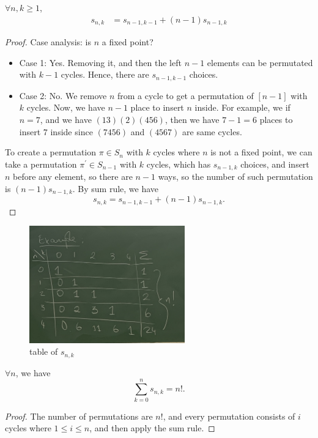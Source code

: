 \begin{proposition} \label{prop: recurtsion for first kind striling num}
    \(\forall n, k \ge 1\), 
    \begin{align*}
        s_{n,k} &= s_{n-1, k-1} + (n-1)s_{n-1,k}
    \end{align*} 
\end{proposition}
\begin{proof}
    Case analysis: is \(n\) a fixed point? 
    \begin{itemize}
        \item Case 1: Yes. Removing it, and then the left \(n-1\) elements can be permutated with \(k-1\) cycles. Hence, there are \(s_{n-1,k-1}\) choices.  
        \item Case 2: No. We remove \(n\) from a cycle to get a permutation of \([n-1]\) with \(k\) cycles. Now, we have \(n-1\) place to insert \(n\) inside. For example, we if \(n=7\), and we have \((13)(2)(456)\), then we have \(7-1=6\) places to insert \(7\) inside since \((7456)\) and \((4567)\) are same cycles.         
    \end{itemize} 
    To create a permutation \(\pi \in S_n\) with \(k\) cycles where \(n\) is not a fixed point, we can take a permutation \(\pi ^{\prime}  \in S_{n-1}\) with \(k\) cycles, which has \(s_{n-1, k}\) choices, and insert \(n\) before any element, so there are \(n-1\) ways, so the number of such permutation is \((n-1)s_{n-1,k}\).  By sum rule, we have 
    \[
        s_{n, k} = s_{n-1, k-1} + (n-1)s_{n-1, k}.
    \]
\end{proof}    
\begin{figure}[H]
    \centering
    \includegraphics[width=0.6\textwidth]{./Figures/IMG_3936.jpg}
    \caption{table of \(s_{n,k}\)}
    \label{fig:table of Stirling number of first kind}
\end{figure}

\begin{corollary}
    \(\forall n\), we have 
    \[
        \sum_{k=0}^n s_{n,k} = n!. 
    \] 
\end{corollary}
\begin{proof}
    The number of permutations are \(n!\), and every permutation consists of \(i\) cycles where \(1 \le i \le n\), and then apply the sum rule.   
\end{proof}

